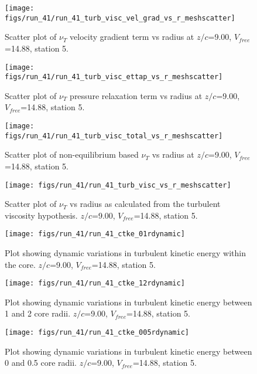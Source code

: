 \begin{figure}[H]
\centering
\texttt{[image: figs/run\_41/run\_41\_turb\_visc\_vel\_grad\_vs\_r\_meshscatter]}
\caption{Scatter plot of $\nu_T$ velocity gradient term vs radius at $z/c$=9.00, $V_{free}$=14.88, station 5.}
\end{figure}


\begin{figure}[H]
\centering
\texttt{[image: figs/run\_41/run\_41\_turb\_visc\_ettap\_vs\_r\_meshscatter]}
\caption{Scatter plot of $\nu_T$ pressure relaxation term vs radius at $z/c$=9.00, $V_{free}$=14.88, station 5.}
\end{figure}


\begin{figure}[H]
\centering
\texttt{[image: figs/run\_41/run\_41\_turb\_visc\_total\_vs\_r\_meshscatter]}
\caption{Scatter plot of non-equilibrium based $\nu_T$ vs radius at $z/c$=9.00, $V_{free}$=14.88, station 5.}
\end{figure}


\begin{figure}[H]
\centering
\texttt{[image: figs/run\_41/run\_41\_turb\_visc\_vs\_r\_meshscatter]}
\caption{Scatter plot of $\nu_T$ vs radius as calculated from the turbulent viscosity hypothesis. $z/c$=9.00, $V_{free}$=14.88, station 5.}
\end{figure}


\begin{figure}[H]
\centering
\texttt{[image: figs/run\_41/run\_41\_ctke\_01rdynamic]}
\caption{Plot showing dynamic variations in turbulent kinetic energy within the core. $z/c$=9.00, $V_{free}$=14.88, station 5.}
\end{figure}


\begin{figure}[H]
\centering
\texttt{[image: figs/run\_41/run\_41\_ctke\_12rdynamic]}
\caption{Plot showing dynamic variations in turbulent kinetic energy between 1 and 2 core radii. $z/c$=9.00, $V_{free}$=14.88, station 5.}
\end{figure}


\begin{figure}[H]
\centering
\texttt{[image: figs/run\_41/run\_41\_ctke\_005rdynamic]}
\caption{Plot showing dynamic variations in turbulent kinetic energy between 0 and 0.5 core radii. $z/c$=9.00, $V_{free}$=14.88, station 5.}
\end{figure}


